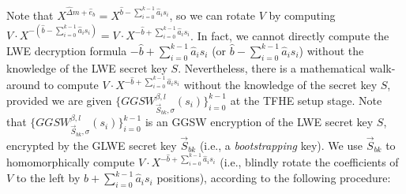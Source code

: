 Note that $X^{\hat{\Delta} m + \hat{e}_b} = X^{\hat{b} - \sum_{i=0}^{k-1}{\hat{a}_is_i}}$, so we can rotate $V$ by computing $V \cdot X^{-(\hat{b} - \sum_{i=0}^{k-1}{\hat{a}_is_i})} = V \cdot X^{-\hat{b} + \sum_{i=0}^{k-1}{\hat{a}_is_i}}$. In fact, we cannot directly compute the LWE decryption formula $-\hat{b} + \sum_{i=0}^{k-1}{\hat{a}_is_i}$ (or $\hat{b} - \sum_{i=0}^{k-1}{\hat{a}_is_i}$) without the knowledge of the LWE secret key $S$. Nevertheless, there is a mathematical walk-around to compute $V \cdot X^{-\hat{b} + \sum_{i=0}^{k-1}{\hat{a}_is_i}}$ without the knowledge of the secret key $S$, provided we are given $\{GGSW_{\vec{S}_{bk}, \sigma}^{\beta, l}(s_i)\}_{i=0}^{k-1}$ at the TFHE setup stage. Note that $\{GGSW_{\vec{S}_{bk}, \sigma}^{\beta, l}(s_i)\}_{i=0}^{k-1}$ is an GGSW encryption of the LWE secret key $S$, encrypted by the GLWE secret key $\vec{S}_{bk}$ (i.e., a \textit{bootstrapping} key). We use $\vec{S}_{bk}$ to homomorphically compute $V \cdot X^{-\hat{b} + \sum_{i=0}^{k-1}{\hat{a}_is_i}}$ (i.e., blindly rotate the coefficients of $V$ to the left by $\hat{b} + \sum_{i=0}^{k-1}{\hat{a}_is_i}$ positions), according to the following procedure:

